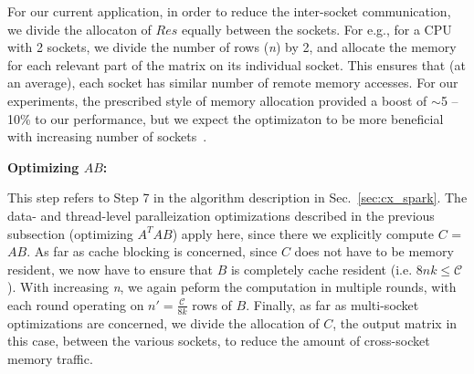      For our current application, in order to reduce the inter-socket
     communication, we divide the allocaton of $Res$ equally between
     the sockets. For e.g., for a CPU with 2 sockets, we divide the
     number of rows ({\it{n}}) by 2, and allocate the memory for each
     relevant part of the matrix on its individual socket. This
     ensures that (at an average), each socket has similar number of
     remote memory accesses. For our experiments, the
     prescribed style of memory allocation provided a boost of
     $\sim$5 -- 10\% to our performance, but we expect the optimizaton
     to be more beneficial with increasing number of
     sockets~\cite{fdsfds}.
     
     







    




\vspace*{0.1in} 
{\bf{{ {Optimizing $AB$:}}}}

    This step refers to Step 7 in the algorithm description in
    Sec.~\ref{sec:cx_spark}. The data- and thread-level paralleization optimizations described 
    in the previous subsection (optimizing $A^TAB$) apply here, since
    there we explicitly  compute $C$ = $AB$. As far as cache blocking is
    concerned, since $C$ does not have to be memory resident, we now have
    to ensure that $B$ is completely cache resident (i.e. $8nk\le
    \mathcal{C}$). With increasing {\it{n}}, we again peform the
    computation in multiple rounds, with each round operating on 
    $n'=\frac{\mathcal{C}}{8k}$ rows of $B$.
    Finally, as far as multi-socket optimizations are concerned, we
    divide the allocation of $C$, the output matrix in this case,
    between the various sockets, to reduce the amount of cross-socket
    memory traffic.

